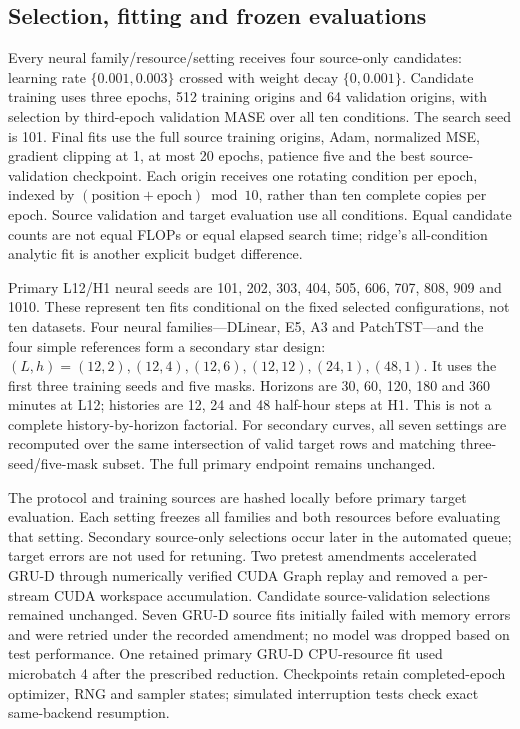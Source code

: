 
\subsection{Selection, fitting and frozen evaluations}
Every neural family/resource/setting receives four source-only candidates: learning rate $\{0.001,0.003\}$ crossed with weight decay $\{0,0.001\}$. Candidate training uses three epochs, 512 training origins and 64 validation origins, with selection by third-epoch validation MASE over all ten conditions. The search seed is 101. Final fits use the full source training origins, Adam, normalized MSE, gradient clipping at 1, at most 20 epochs, patience five and the best source-validation checkpoint. Each origin receives one rotating condition per epoch, indexed by $(\mathrm{position}+\mathrm{epoch})\bmod10$, rather than ten complete copies per epoch. Source validation and target evaluation use all conditions. Equal candidate counts are not equal FLOPs or equal elapsed search time; ridge's all-condition analytic fit is another explicit budget difference.

Primary L12/H1 neural seeds are 101, 202, 303, 404, 505, 606, 707, 808, 909 and 1010. These represent ten fits conditional on the fixed selected configurations, not ten datasets. Four neural families---DLinear, E5, A3 and PatchTST---and the four simple references form a secondary star design: $(L,h)=(12,2),(12,4),(12,6),(12,12),(24,1),(48,1)$. It uses the first three training seeds and five masks. Horizons are 30, 60, 120, 180 and 360 minutes at L12; histories are 12, 24 and 48 half-hour steps at H1. This is not a complete history-by-horizon factorial. For secondary curves, all seven settings are recomputed over the same intersection of valid target rows and matching three-seed/five-mask subset. The full primary endpoint remains unchanged.

The protocol and training sources are hashed locally before primary target evaluation. Each setting freezes all families and both resources before evaluating that setting. Secondary source-only selections occur later in the automated queue; target errors are not used for retuning. Two pretest amendments accelerated GRU-D through numerically verified CUDA Graph replay and removed a per-stream CUDA workspace accumulation. Candidate source-validation selections remained unchanged. Seven GRU-D source fits initially failed with memory errors and were retried under the recorded amendment; no model was dropped based on test performance. One retained primary GRU-D CPU-resource fit used microbatch 4 after the prescribed reduction. Checkpoints retain completed-epoch optimizer, RNG and sampler states; simulated interruption tests check exact same-backend resumption.

